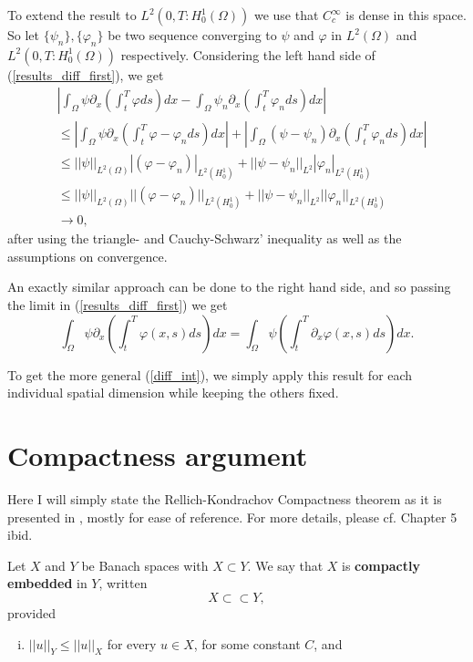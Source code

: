 \documentclass[11pt, a4paper]{article}
\begin{document}
\begin{appendix}
To extend the result to $L^2(0,T:H_0^1 (\Omega))$ we use that $C_c^\infty$ is dense in this space. So let $\{\psi_n\},\{\varphi_n\}$ be two sequence converging to $\psi$ and $\varphi$ in $L^2(\Omega)$ and $L^2(0,T:H_0^1(\Omega))$ respectively. Considering the left hand side of (\ref{results_diff_first}), we get
\begin{align*}
&\left|\int_{\Omega}\psi \partial_x \left( \int_t^T\varphi ds \right)dx - \int_{\Omega}\psi_n \partial_x \left( \int_t^T \varphi_n ds \right) dx \right| \\
&\leq  \left| \int_{\Omega} \psi \partial_x \left(\int_t^T \varphi - \varphi_n ds\right)dx \right| + \left| \int_{\Omega}(\psi - \psi_n)\partial_x\left(\int_t^T \varphi_n ds\right) dx \right| \\
&\leq ||\psi||_{L^2(\Omega)}|(\varphi -\varphi_n)|_{L^2(H_0^1)} + ||\psi-\psi_n||_{L^2}| \varphi_n |_{L^2(H_0^1)} \\
&\leq ||\psi||_{L^2(\Omega)}||(\varphi -\varphi_n)||_{L^2(H_0^1)} + ||\psi-\psi_n||_{L^2}|| \varphi_n ||_{L^2(H_0^1)} \\
&\to 0,
\end{align*}
after using the triangle- and Cauchy-Schwarz' inequality as well as the assumptions on convergence.

An exactly similar approach can be done to the right hand side, and so passing the limit in (\ref{results_diff_first}) we get
\begin{equation}
\label{result_diff_final}
\int_\Omega \psi \partial_x\left(\int_t^T \varphi(x,s)ds\right)dx = \int_\Omega \psi \left( \int_t^T \partial_x \varphi(x,s)ds \right) dx.
\end{equation}

To get the more general (\ref{diff_int}), we simply apply this result for each individual spatial dimension while keeping the others fixed.



\newpage
\section{Compactness argument}
\label{sec:compactness}
Here I will simply state the Rellich-Kondrachov Compactness theorem as it is presented in \citep{evans}, mostly for ease of reference. For more details, please cf. Chapter 5 ibid.

\begin{mydef}
Let $X$ and $Y$ be Banach spaces with $X \subset Y$. We say that $X$ is \textbf{compactly embedded} in $Y$, written
\begin{equation*}
X \subset \subset Y,
\end{equation*}
provided 
\begin{enumerate}[i)]
	\item $||u||_Y \leq ||u||_X$ for every $u \in X$, for some constant $C$, and


\end{enumerate}
\end{mydef}
\end{appendix}
\end{document}
